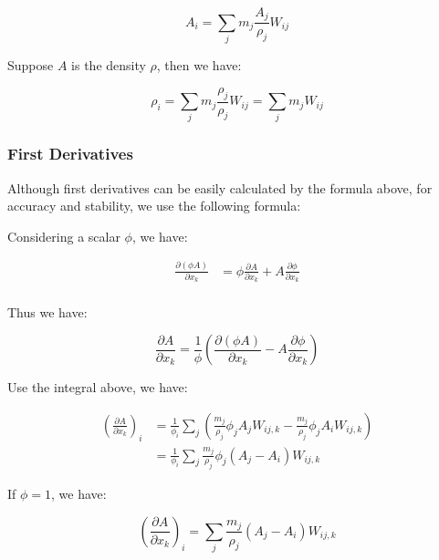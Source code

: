 \documentclass[10pt, oneside]{article}
\begin{document}
\begin{equation}
    A_i = \sum_jm_j \frac{A_j}{\rho_j}W_{ij}
\end{equation}

Suppose $A$ is the density $\rho$, then we have:

\begin{equation}
    \rho_i = \sum_jm_j \frac{\rho_j}{\rho_j}W_{ij} = \sum_jm_j W_{ij}
\end{equation}

\subsubsection{First Derivatives}

Although first derivatives can be easily calculated by the formula above, 
for accuracy and stability, we use the following formula:

Considering a scalar $\phi$, we have:

\begin{equation}
    \begin{aligned}
        \frac{\partial (\phi A)}{\partial x_k}&=
        \phi \frac{\partial A}{\partial x_k} + A \frac{\partial \phi}{\partial x_k}\\
    \end{aligned}
\end{equation}

Thus we have:

\begin{equation}
    \frac{\partial A}{\partial x_k}=\frac{1}{\phi}
    \left(
        \frac{\partial (\phi A)}{\partial x_k} - A \frac{\partial \phi}{\partial x_k}
    \right)
\end{equation}

Use the integral above, we have:

\begin{equation}
    \begin{aligned}
        \left(
        \frac{\partial A}{\partial x_k}
    \right)_i &=
    \frac{1}{\phi_i}
        \sum_j
        \left(\frac{m_j}{\rho_j} \phi_j A_j W_{ij,k}
        - \frac{m_j}{\rho_j} \phi_j A_iW_{ij,k}
        \right)\\
        &=\frac{1}{\phi_i}
        \sum_j
        \frac{m_j}{\rho_j} \phi_j (A_j-A_i)W_{ij,k}
    \end{aligned}
\end{equation}

If $\phi=1$, we have:

\begin{equation}
    \left(
        \frac{\partial A}{\partial x_k}
    \right)_i = \sum_j \frac{m_j}{\rho_j} (A_j-A_i)W_{ij,k}
\end{equation}
\end{document}
